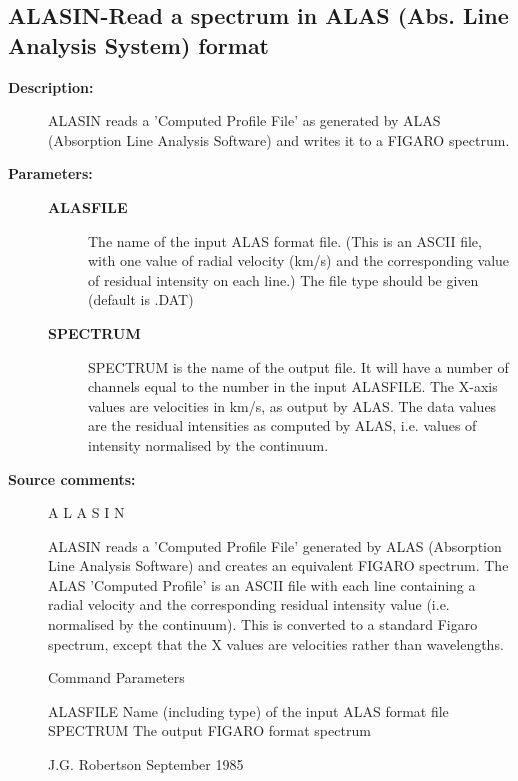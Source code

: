 \subsection{ALASIN-\label{ALASIN}Read a spectrum in ALAS (Abs. Line Analysis System) format}
\begin{description}

\item [\textbf{Description:}]
 ALASIN reads a 'Computed Profile File' as generated by ALAS
 (Absorption Line Analysis Software) and writes it to a FIGARO
 spectrum.

\item [\textbf{Parameters:}]
\begin{description}
\item [\textbf{ALASFILE}]
 The name of the input ALAS format file. (This is an
 ASCII file, with one value of radial velocity (km/s) and the
 corresponding value of residual intensity on each line.)
 The file type should be given (default is .DAT)
\item [\textbf{SPECTRUM}]
 SPECTRUM is the name of the output file.  It will have a
 number of channels equal to the number in the input ALASFILE.
 The X-axis values are velocities in km/s, as output by ALAS.
 The data values are the residual intensities as computed by ALAS,
 i.e. values of intensity normalised by the continuum.
\end{description}

\item [\textbf{Source comments:}]
\begin{terminalv}
 A L A S I N

 ALASIN reads a 'Computed Profile File' generated by ALAS
 (Absorption Line Analysis Software) and creates an
 equivalent FIGARO spectrum.
    The ALAS 'Computed Profile' is an ASCII file with each line
 containing a radial velocity and the corresponding residual
 intensity value (i.e. normalised by the continuum).  This is
 converted to a standard Figaro spectrum, except that the X values
 are velocities rather than wavelengths.

 Command Parameters

 ALASFILE    Name (including type) of the input ALAS format file
 SPECTRUM    The output FIGARO format spectrum

                             J.G. Robertson  September 1985
\end{terminalv}
\end{description}
